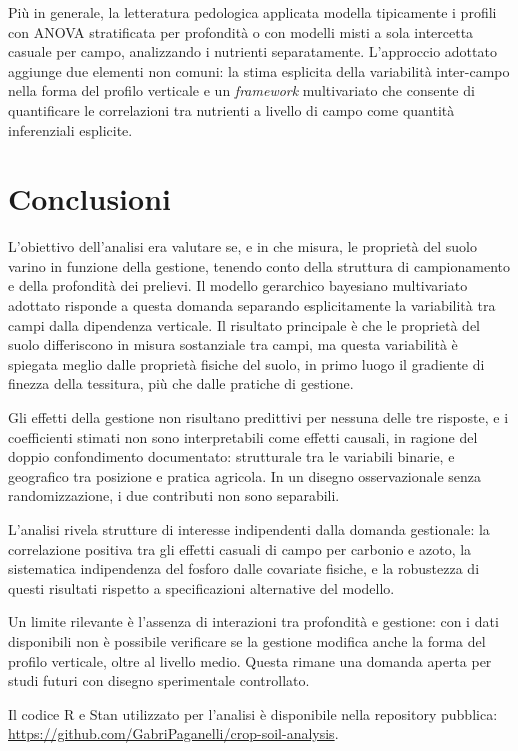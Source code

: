 \documentclass[11pt, a4paper]{article}
\begin{document}
Più in generale, la letteratura pedologica applicata modella tipicamente i
profili con ANOVA stratificata per profondità o con modelli misti a sola
intercetta casuale per campo, analizzando i nutrienti separatamente.
L'approccio adottato aggiunge due elementi non comuni: la stima esplicita
della variabilità inter-campo nella forma del profilo verticale e un
\textit{framework} multivariato che consente di quantificare le correlazioni
tra nutrienti a livello di campo come quantità inferenziali esplicite.

\section{Conclusioni}

L'obiettivo dell'analisi era valutare se, e in che misura, le proprietà
del suolo varino in funzione della gestione, tenendo conto della struttura
di campionamento e della profondità dei prelievi. Il modello gerarchico
bayesiano multivariato adottato risponde a questa domanda separando
esplicitamente la variabilità tra campi dalla dipendenza verticale. Il
risultato principale è che le proprietà del suolo differiscono in misura
sostanziale tra campi, ma questa variabilità è spiegata meglio dalle
proprietà fisiche del suolo, in primo luogo il gradiente di finezza della
tessitura, più che dalle pratiche di gestione.

Gli effetti della gestione non risultano predittivi per nessuna delle tre
risposte, e i coefficienti stimati non sono interpretabili come effetti
causali, in ragione del doppio confondimento documentato: strutturale tra
le variabili binarie, e geografico tra posizione e pratica agricola. In un
disegno osservazionale senza randomizzazione, i due contributi non sono
separabili.

L'analisi rivela strutture di interesse indipendenti dalla domanda
gestionale: la correlazione positiva tra gli effetti casuali di campo per
carbonio e azoto, la sistematica indipendenza del fosforo dalle covariate
fisiche, e la robustezza di questi risultati rispetto a specificazioni
alternative del modello.

Un limite rilevante è l'assenza di interazioni tra profondità e gestione:
con i dati disponibili non è possibile verificare se la gestione modifica
anche la forma del profilo verticale, oltre al livello medio. Questa rimane
una domanda aperta per studi futuri con disegno sperimentale controllato.

Il codice R e Stan utilizzato per l'analisi è disponibile nella repository pubblica:
\url{https://github.com/GabriPaganelli/crop-soil-analysis}.
\end{document}
